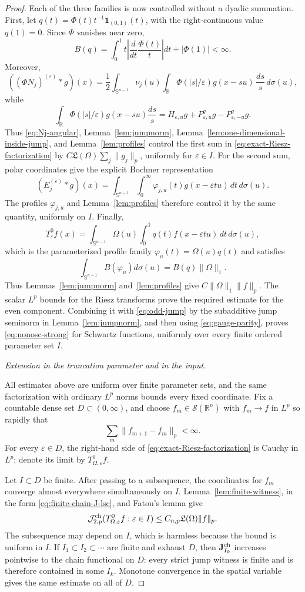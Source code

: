 \documentclass[11pt]{article}
\numberwithin{equation}{section}
\theoremstyle{remark}
\theoremstyle{definition}
\newcommand{\R}{\mathbb R}
\newcommand{\Sph}{\mathbb S}
\newcommand{\norm}[1]{\lVert #1\rVert}
\begin{document}
\begin{proof}
Each of the three families is now controlled without a dyadic summation.
First, let $q(t)=\Phi(t)t^{-1}\mathbf1_{(0,1)}(t)$, with the
right-continuous value $q(1)=0$.  Since $\Phi$ vanishes near zero,
\[
 B(q)=\int_0^1t\left|\frac d{dt}\frac{\Phi(t)}t\right|dt
      +|\Phi(1)|<\infty.
\]
Moreover,
\[
 ((\Phi N_j)^{(\varepsilon)}*g)(x)
 =\frac12\int_{\Sph^{n-1}}\nu_j(u)
 \int_{\R}\Phi(|s|/\varepsilon)g(x-su)\,\frac{ds}{s}
 \,d\sigma(u),
\]
while
\[
 \int_{\R}\Phi(|s|/\varepsilon)g(x-su)\frac{ds}{s}
 =H_{\varepsilon,u}g+P^q_{\varepsilon,u}g-P^q_{\varepsilon,-u}g.
\]
Thus \eqref{eq:Nj-angular}, Lemma~\ref{lem:jumpnorm},
Lemma~\ref{lem:one-dimensional-inside-jump}, and
Lemma~\ref{lem:profiles} control
the first sum in
\eqref{eq:exact-Riesz-factorization} by
$C\mathfrak L(\Omega)\sum_j\norm{g_j}_p$, uniformly for
$\varepsilon\in I$.  For the second sum, polar coordinates give the
explicit Bochner representation
\[
 (E_j^{(\varepsilon)}*g)(x)
 =\int_{\Sph^{n-1}}\int_0^\infty
   \varphi_{j,u}(t)g(x-\varepsilon tu)\,dt\,d\sigma(u).
\]
The profiles $\varphi_{j,u}$ and Lemma~\ref{lem:profiles} therefore
control it by the same quantity, uniformly on $I$.  Finally,
\[
 T^0_\varepsilon f(x)=\int_{\Sph^{n-1}}\Omega(u)
 \int_0^1q(t)f(x-\varepsilon tu)\,dt\,d\sigma(u),
\]
which is the parameterized profile family
$\varphi_u(t)=\Omega(u)q(t)$ and satisfies
\[
 \int_{\Sph^{n-1}}B(\varphi_u)d\sigma(u)
 =B(q)\|\Omega\|_1.
\]
Thus Lemmas~\ref{lem:jumpnorm} and~\ref{lem:profiles} give
$C\norm\Omega_1\norm f_p$.  The scalar $L^p$ bounds for the Riesz transforms
\cite{SteinSI} prove the required estimate for the even component.  Combining
it with \eqref{eq:odd-jump} by the subadditive jump seminorm in
Lemma~\ref{lem:jumpnorm}, and then using \eqref{eq:gauge-parity}, proves
\eqref{eq:nonosc-strong} for Schwartz functions, uniformly over every
finite ordered parameter set $I$.

\smallskip
\noindent\emph{Extension in the truncation parameter and in the input.}

All estimates above are uniform over finite parameter sets, and the same
factorization with ordinary $L^p$ norms bounds every fixed coordinate.
Fix a countable dense set $D\subset(0,\infty)$, and choose
$f_m\in\mathcal S(\R^n)$ with $f_m\to f$ in $L^p$ so rapidly that
\[
 \sum_m\|f_{m+1}-f_m\|_p<\infty.
\]
For every
$\varepsilon\in D$, the right-hand side of
\eqref{eq:exact-Riesz-factorization} is Cauchy in $L^p$; denote its limit
by $T^0_{\Omega,\varepsilon}f$.

Let $I\subset D$ be finite.  After passing to a subsequence, the
coordinates for $f_m$ converge almost everywhere simultaneously on $I$.
Lemma~\ref{lem:finite-witness}, in the form
\eqref{eq:finite-chain-J-lsc}, and Fatou's lemma give
\[
 \mathcal J^{\rm ch}_{2,p}
 (T^0_{\Omega,\varepsilon}f:\varepsilon\in I)
 \le C_{n,p}\mathfrak L(\Omega)\norm f_p.
\]
The subsequence may depend on $I$, which is harmless because the bound is
uniform in $I$.  If $I_1\subset I_2\subset\cdots$ are finite and exhaust
$D$, then $\mathbf J^{\rm ch}_{I_k}$ increases pointwise to the chain
functional on $D$: every strict jump witness is finite and is therefore
contained in some $I_k$.  Monotone convergence in the spatial variable
gives the same estimate on all of $D$.


\end{proof}
\end{document}
